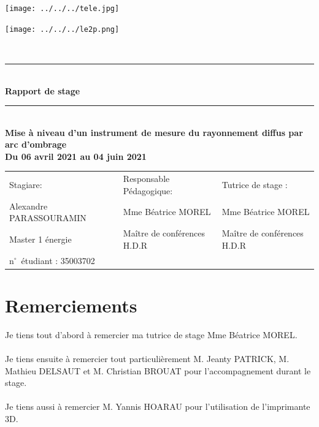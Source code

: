 \documentclass[12pt,a4paper]{article}
\begin{document}
\begin{titlepage}
\begin{minipage}[c]{.46\linewidth}
     \begin{center}
         \texttt{[image: ../../../tele.jpg]}   
         
         \end{center}
   \end{minipage} \hfill
   \begin{minipage}[c]{.46\linewidth}
    \begin{center}
       \texttt{[image: ../../../le2p.png]}   
        \end{center}
 \end{minipage}
\newcommand{\HRule}{\rule{\linewidth}{0.5mm}}
\center
\textsc{\LARGE} \\[3cm]

\HRule \\[0.4cm]
{ \huge \bfseries Rapport de stage\\ [0.15cm] }
\HRule \\[1cm]

\textbf{ Mise à niveau d'un instrument de mesure du rayonnement diffus par arc d’ombrage}\\[1cm]
\textbf{ Du 06 avril 2021 au 04 juin 2021}\\[8cm]
\begin{tabular}{lll}
   \sf Stagiare: &\sf Responsable Pédagogique: &\sf Tutrice de stage : \\
  \sf Alexandre PARASSOURAMIN &\sf Mme Béatrice MOREL &\sf Mme Béatrice MOREL \\
   \sf Master 1 énergie& \sf Maître de conférences H.D.R & \sf Maître de conférences H.D.R\\
  \sf n$^\circ$~étudiant : 35003702& & \\
\end{tabular}




\end{titlepage}
\newpage
\thispagestyle{empty}

\section*{Remerciements}
\sf
Je tiens tout d'abord à remercier ma tutrice de stage Mme Béatrice MOREL.\\
~\\
Je tiens ensuite à remercier tout particulièrement M. Jeanty PATRICK, M. Mathieu DELSAUT et M. Christian BROUAT pour l'accompagnement durant le stage.\\
~\\
Je tiens aussi à remercier M. Yannis HOARAU pour l'utilisation de l'imprimante 3D.
 
\end{document}
